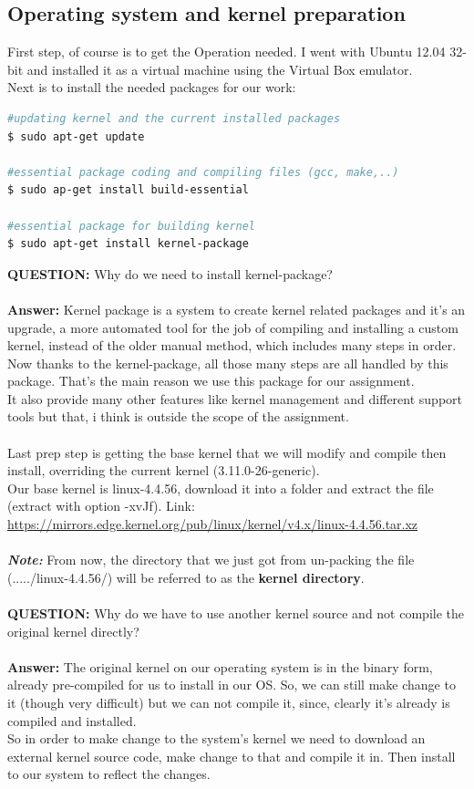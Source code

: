 \documentclass[a4paper]{article}
\begin{document}
\subsection{Operating system and kernel preparation}
First step, of course is to get the Operation needed. I went with Ubuntu 12.04 32-bit and installed it as a virtual machine using the Virtual Box emulator.\\
Next is to install the needed packages for our work:
\begin{lstlisting}[language=bash]
#updating kernel and the current installed packages
$ sudo apt-get update

#essential package coding and compiling files (gcc, make,..)
$ sudo ap-get install build-essential

#essential package for building kernel
$ sudo apt-get install kernel-package
\end{lstlisting}
\textbf{QUESTION:} Why do we need to install kernel-package?\\\\
\textbf{Answer:} Kernel package is a system to create kernel related packages and it's an upgrade, a more automated tool for the job of compiling and installing a custom kernel, instead of the older manual method, which includes many steps in order.\\
Now thanks to the kernel-package, all those many steps are all handled by this package. That's the main reason we use this package for our assignment. \\
It also provide many other features like kernel management and different support tools but that, i think is outside the scope of the assignment.\\\\
Last prep step is getting the base kernel that we will modify and compile then install, overriding the current kernel (3.11.0-26-generic).\\
Our base kernel is linux-4.4.56, download it into a folder and extract the file (extract with option -xvJf). Link: \url{https://mirrors.edge.kernel.org/pub/linux/kernel/v4.x/linux-4.4.56.tar.xz}\\\\
\textbf{\textit{Note:}} From now, the directory that we just got from un-packing the file (...../linux-4.4.56/) will be referred to as the \textbf{kernel directory}.\\\\
\textbf{QUESTION:} Why do we have to use another kernel source and not compile the original kernel directly?\\\\
\textbf{Answer:} The original kernel on our operating system is in the binary form, already pre-compiled for us to install in our OS. So, we can still make change to it (though very difficult) but we can not compile it, since, clearly it's already is compiled and installed.\\
So in order to make change to the system's kernel we need to download an external kernel source code, make change to that and compile it in. Then install to our system to reflect the changes.\\
\end{document}
